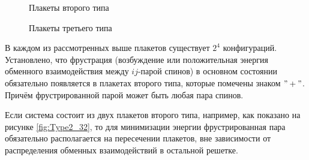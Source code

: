 \documentclass[utf8, babel, sor, jor, amsmath, amssymb, reprint]{elsarticle} %
\begin{document}
\begin{figure}[H]
\begin{minipage}{0.3\textwidth}
		\caption{Плакеты второго типа}
		\label{fig:Type2}
	\end{minipage}
	\hspace{5pt}
	\begin{minipage}{0.3\textwidth}
		\centering
		\hspace{-4pt} 
		\caption{Плакеты третьего типа}
		\label{fig:Type3}
	\end{minipage}
\end{figure}


В каждом из рассмотренных выше плакетов существует $2^4$ конфигураций.
Установлено, что фрустрация (возбуждение или положительная энергия обменного взаимодействия между $ij$-парой спинов) в основном состоянии обязательно появляется в плакетах второго типа, которые помечены знаком $"+"$. Причём фрустрированной парой может быть любая пара спинов.


Если система состоит из двух плакетов второго типа, например, как показано на рисунке \ref{fig:Type2_32}, то для минимизации энергии фрустрированная пара обязательно располагается на пересечении плакетов, вне зависимости от распределения обменных взаимодействий в остальной решетке. 
\end{document}
